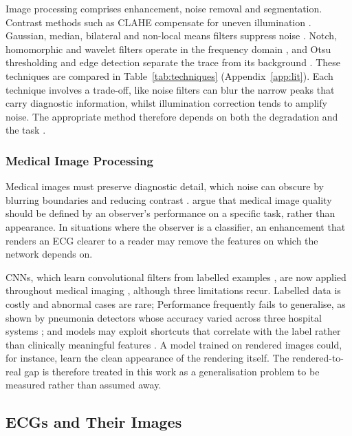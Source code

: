 \documentclass[12pt,nonacm,acmlarge,titlepage,screen]{acmart}
\begin{document}
Image processing comprises enhancement, noise removal and segmentation. Contrast methods such as CLAHE compensate for uneven illumination \cite{pizer_adaptive_1987,pizer_contrast_1990}. Gaussian, median, bilateral and non-local means filters suppress noise \cite{gonzalez_digital_2018,tomasi_bilateral_1998,buades_non-local_2005}. Notch, homomorphic and wavelet filters operate in the frequency domain \cite{stockham_image_1972,lepcha_deep_2023}, and Otsu thresholding and edge detection separate the trace from its background \cite{otsu_threshold_1979,canny_computational_1986}. These techniques are compared in Table~\ref{tab:techniques} (Appendix~\ref{app:lit}). Each technique involves a trade-off, like noise filters can blur the narrow peaks that carry diagnostic information, whilst illumination correction tends to amplify noise. The appropriate method therefore depends on both the degradation and the task \cite{qi_comprehensive_2022}.

\subsubsection{Medical Image Processing}
\label{sec:medical-imaging}

Medical images must preserve diagnostic detail, which noise can obscure by blurring boundaries and reducing contrast \cite{prasad_systematic_2023}. \citet{barrett_foundations_2004} argue that medical image quality should be defined by an observer's performance on a specific task, rather than appearance. In situations where the observer is a classifier, an enhancement that renders an ECG clearer to a reader may remove the features on which the network depends on.

CNNs, which learn convolutional filters from labelled examples \cite{lecun_gradient_1998}, are now applied throughout medical imaging \cite{litjens_survey_2017}, although three limitations recur. Labelled data is costly and abnormal cases are rare; Performance frequently fails to generalise, as shown by pneumonia detectors whose accuracy varied across three hospital systems \cite{zech_variable_2018}; and models may exploit shortcuts that correlate with the label rather than clinically meaningful features \cite{geirhos_shortcut_2020}. A model trained on rendered images could, for instance, learn the clean appearance of the rendering itself. The rendered-to-real gap is therefore treated in this work as a generalisation problem to be measured rather than assumed away.

\subsection{ECGs and Their Images}
\label{sec:ecg-group}
\end{document}
